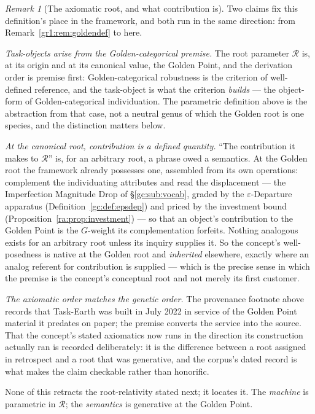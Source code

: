 \documentclass[11pt]{article}
\numberwithin{equation}{section}
\theoremstyle{plain}
\theoremstyle{definition}
\theoremstyle{remark}
\newtheorem{remark}[theorem]{Remark}
\begin{document}
\begin{remark}[The axiomatic root, and what contribution is]
\label{to:rem:goldenroot}
Two claims fix this definition's place in the framework, and both run
in the same direction: from Remark~\ref{gr1:rem:goldendef} to here.

\emph{Task-objects arise from the Golden-categorical premise.} The
root parameter $\mathcal R$ is, at its origin and at its canonical
value, the Golden Point, and the derivation order is premise first:
Golden-categorical robustness is the criterion of well-defined
reference, and the task-object is what the criterion \emph{builds}
--- the object-form of Golden-categorical individuation. The
parametric definition above is the abstraction from that case, not a
neutral genus of which the Golden root is one species, and the
distinction matters below.

\emph{At the canonical root, contribution is a defined quantity.}
``The contribution it makes to $\mathcal R$'' is, for an arbitrary
root, a phrase owed a semantics. At the Golden root the framework
already possesses one, assembled from its own operations: complement
the individuating attributes and read the displacement --- the
Imperfection Magnitude Drop of \S\ref{gc:sub:vocab}, graded by the
$\varepsilon$-Departure apparatus (Definition~\ref{gc:def:epsdep})
and priced by the investment bound
(Proposition~\ref{ra:prop:investment}) --- so that an object's
contribution to the Golden Point is the $G$-weight its complementation
forfeits. Nothing analogous exists for an arbitrary root unless its
inquiry supplies it. So the concept's well-posedness is native at the
Golden root and \emph{inherited} elsewhere, exactly where an analog
referent for contribution is supplied --- which is the precise sense
in which the premise is the concept's conceptual root and not merely
its first customer.

\emph{The axiomatic order matches the genetic order.} The provenance
footnote above records that Task-Earth was built in July 2022 in
service of the Golden Point material it predates on paper; the premise
converts the service into the source. That the concept's stated
axiomatics now runs in the direction its construction actually ran is
recorded deliberately: it is the difference between a root assigned in
retrospect and a root that was generative, and the corpus's dated
record is what makes the claim checkable rather than honorific.

None of this retracts the root-relativity stated next; it locates it.
The \emph{machine} is parametric in $\mathcal R$; the
\emph{semantics} is generative at the Golden Point.
\end{remark}
\end{document}
